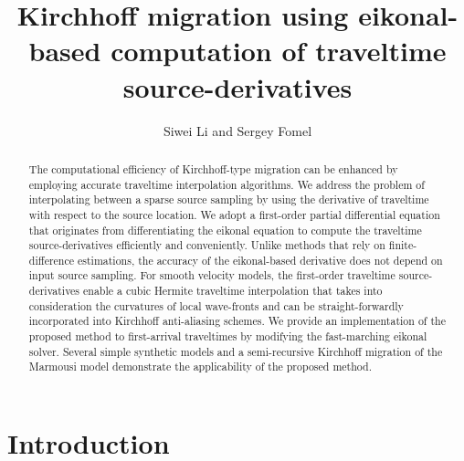 
\title{Kirchhoff migration using eikonal-based computation of traveltime source-derivatives}

\author{Siwei Li and Sergey Fomel}


\address{Bureau of Economic Geology \\
John A. and Katherine G. Jackson School of Geosciences \\
The University of Texas at Austin \\
University Station, Box X \\
Austin, TX 78713-8924}


\maketitle

\begin{abstract}
The computational efficiency of Kirchhoff-type migration can be enhanced by employing accurate 
traveltime interpolation algorithms. We address the problem of interpolating between a sparse source 
sampling by using the derivative of traveltime with respect to the source location. We adopt a 
first-order partial differential equation that originates from differentiating the eikonal equation 
to compute the traveltime source-derivatives efficiently and conveniently. Unlike methods that rely 
on finite-difference estimations, the accuracy of the eikonal-based derivative does not depend on 
input source sampling. For smooth velocity models, the first-order traveltime source-derivatives 
enable a cubic Hermite traveltime interpolation that takes into consideration the curvatures of 
local wave-fronts and can be straight-forwardly incorporated into Kirchhoff anti-aliasing schemes. 
We provide an implementation of the proposed method to first-arrival traveltimes by modifying the 
fast-marching eikonal solver. Several simple synthetic models and a semi-recursive Kirchhoff migration 
of the Marmousi model demonstrate the applicability of the proposed method.
\end{abstract}

\section{Introduction}


